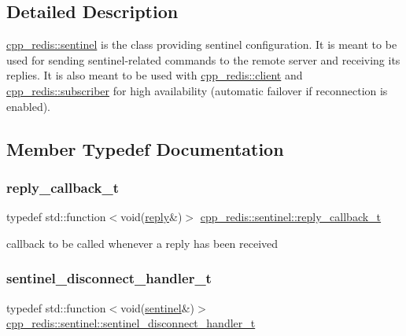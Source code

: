 \subsection{Detailed Description}
\hyperlink{classcpp__redis_1_1sentinel}{cpp\+\_\+redis\+::sentinel} is the class providing sentinel configuration. It is meant to be used for sending sentinel-\/related commands to the remote server and receiving its replies. It is also meant to be used with \hyperlink{classcpp__redis_1_1client}{cpp\+\_\+redis\+::client} and \hyperlink{classcpp__redis_1_1subscriber}{cpp\+\_\+redis\+::subscriber} for high availability (automatic failover if reconnection is enabled). 

\subsection{Member Typedef Documentation}
\mbox{\label{classcpp__redis_1_1sentinel_ae1a150ff8787208c47414397a061c9a7}} 
\subsubsection{\texorpdfstring{reply\+\_\+callback\+\_\+t}{reply\_callback\_t}}
{\footnotesize\ttfamily typedef std\+::function$<$void(\hyperlink{classcpp__redis_1_1reply}{reply}\&)$>$ \hyperlink{classcpp__redis_1_1sentinel_ae1a150ff8787208c47414397a061c9a7}{cpp\+\_\+redis\+::sentinel\+::reply\+\_\+callback\+\_\+t}}

callback to be called whenever a reply has been received \mbox{\label{classcpp__redis_1_1sentinel_a923e06b5b700c16dffec8a01d2fa9aa4}} 
\subsubsection{\texorpdfstring{sentinel\+\_\+disconnect\+\_\+handler\+\_\+t}{sentinel\_disconnect\_handler\_t}}
{\footnotesize\ttfamily typedef std\+::function$<$void(\hyperlink{classcpp__redis_1_1sentinel}{sentinel}\&)$>$ \hyperlink{classcpp__redis_1_1sentinel_a923e06b5b700c16dffec8a01d2fa9aa4}{cpp\+\_\+redis\+::sentinel\+::sentinel\+\_\+disconnect\+\_\+handler\+\_\+t}}

